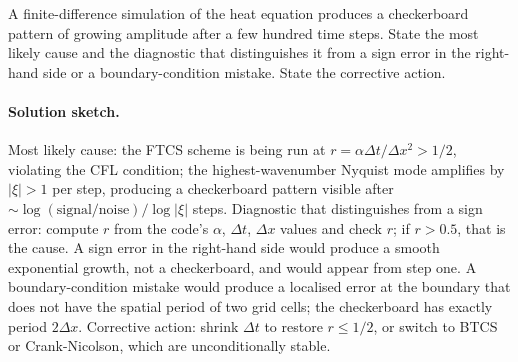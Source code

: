 \begin{exercise}
A finite-difference simulation of the heat equation produces a
checkerboard pattern of growing amplitude after a few hundred
time steps. State the most likely cause and the diagnostic that
distinguishes it from a sign error in the right-hand side or a
boundary-condition mistake. State the corrective action.

\paragraph{Solution sketch.}
Most likely cause: the FTCS scheme is being run at $r =
\alpha\Delta t/\Delta x^{2} > 1/2$, violating the CFL condition;
the highest-wavenumber Nyquist mode amplifies by $|\xi| > 1$ per
step, producing a checkerboard pattern visible after $\sim
\log(\text{signal/noise})/\log|\xi|$ steps. Diagnostic that
distinguishes from a sign error: compute $r$ from the code's
$\alpha$, $\Delta t$, $\Delta x$ values and check $r$; if $r >
0.5$, that is the cause. A sign error in the right-hand side
would produce a smooth exponential growth, not a checkerboard,
and would appear from step one. A boundary-condition mistake
would produce a localised error at the boundary that does not
have the spatial period of two grid cells; the checkerboard has
exactly period $2 \Delta x$. Corrective action: shrink $\Delta t$
to restore $r \leq 1/2$, or switch to BTCS or Crank-Nicolson,
which are unconditionally stable.
\end{exercise}

